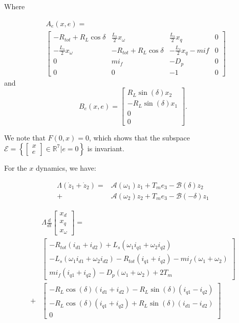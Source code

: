 \documentclass[letterpaper, 10 pt, conference]{ieeeconf}  %
\begin{document}
Where 

$$
\begin{aligned}
&A_e\left(x,e\right)  = \\ & \left[\begin{array}{cccc}
-R_{tot}+R_{L}\cos\delta & \frac{L_{s}}{2}x_{\omega} & \frac{L_{s}}{2}x_{q} & 0\\
-\frac{L_{s}}{2}x_{\omega} & -R_{tot}+R_{L}\cos\delta & -\frac{L_{s}}{2}x_{q}-mif & 0\\
0 & mi_{f} & -D_{p} & 0\\
0 & 0 & -1 & 0
\end{array}\right]
\end{aligned}
$$ 
and
$$
B_e\left(x,e\right) = 
\left[\begin{array}{c}
R_{L}\sin(\delta)x_{2}\\
-R_{L}\sin(\delta)x_{1}\\
0\\
0
\end{array}\right].
$$



We note that $F(0,x)=0$, which shows that the subspace
$\mathscr{E}=\left\{ \left[\begin{array}{c}
x\\
e
\end{array}\right]\in\mathbb{R}^{7}|e=0\right\} $ is invariant.

For the $x$ dynamics, we have:

$$
\begin{aligned}
\Lambda(\dot{z}_{1}+\dot{z}_{2})= & \mathcal{A}(\omega_{1})z_{1}+T_{m}e_{3}-\mathcal{B}(\delta)z_{2}\\+&\mathcal{A}(\omega_{2})z_{2}  +T_{m}e_{3}-\mathcal{B}(-\delta)z_{1}
\end{aligned}
$$

$$
\begin{aligned}
&\Lambda\frac{d}{dt}\left[\begin{array}{c}
x_{d}\\
x_{q}\\
x_{\omega}
\end{array}\right]  = \\
 & \left[\begin{array}{c}
-R_{tot}(i_{d1}+i_{d2})+L_{s}(\omega_{1}i_{q1}+\omega_{2}i_{q2})\\
-L_{s}(\omega_{1}i_{d1}+\omega_{2}i_{d2})-R_{tot}(i_{q1}+i_{q2})-mi_{f}(\omega_{1}+\omega_{2})\\
mi_{f}(i_{q1}+i_{q2})-D_{p}(\omega_{1}+\omega_{2})+2T_{m}
\end{array}\right]\\
 +& \left[\begin{array}{c}
-R_{L}\cos(\delta)(i_{d1}+i_{d2})-R_{L}\sin(\delta)(i_{q1}-i_{q2})\\
-R_{L}\cos(\delta)(i_{q1}+i_{q2})+R_{L}\sin(\delta)(i_{d1}-i_{d2})\\
0
\end{array}\right]
\end{aligned}
$$
\end{document}
